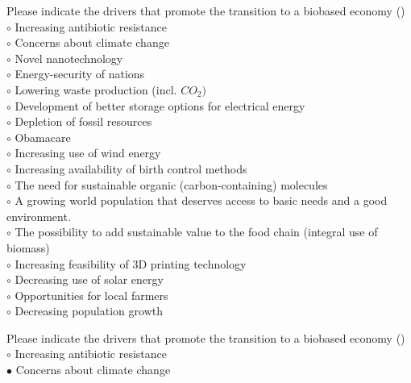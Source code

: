 \documentclass[]{beamer}
\begin{document}
\begin{CJK}{UTF8}{gbsn}
\begin{frame}[shrink] {}
\addtocounter{questions}{1}
\color{blue}
Please indicate the drivers that promote the transition to a biobased economy
({})\\
\color{black}
\setlength{\parindent}{-0.4cm}
{\color{red}$\circ$} Increasing antibiotic resistance  \\
{\color{red}$\circ$}     Concerns about climate change  \\
{\color{red}$\circ$}  Novel nanotechnology   \\
{\color{red}$\circ$}  Energy-security of nations  \\
{\color{red}$\circ$}  Lowering waste production (incl. $CO_{2})$   \\
{\color{red}$\circ$} Development of better storage options for electrical energy  \\
{\color{red}$\circ$}  Depletion of fossil resources   \\
{\color{red}$\circ$} Obamacare  \\
{\color{red}$\circ$} Increasing use of wind energy  \\
{\color{red}$\circ$} Increasing availability of birth control methods  \\
{\color{red}$\circ$}  The need for sustainable organic (carbon-containing) molecules  \\
{\color{red}$\circ$}  A growing world population that deserves access to basic needs and a good environment.  \\
{\color{red}$\circ$}  The possibility to add sustainable value to the food chain (integral use of biomass)  \\
{\color{red}$\circ$} Increasing feasibility of 3D printing technology  \\
{\color{red}$\circ$} Decreasing use of solar energy  \\
{\color{red}$\circ$}  Opportunities for local farmers  \\
{\color{red}$\circ$} Decreasing population growth  \\
\end{frame}
\begin{frame}[shrink] {}
\addtocounter{answers}{1}
\color{blue}
Please indicate the drivers that promote the transition to a biobased economy
({})\\
\color{black}
\setlength{\parindent}{-0.4cm}
{\color{red}$\circ$} Increasing antibiotic resistance  \\
{\color{red}$\bullet$} Concerns about climate change  \\

\end{frame}
\end{CJK}
\end{document}
